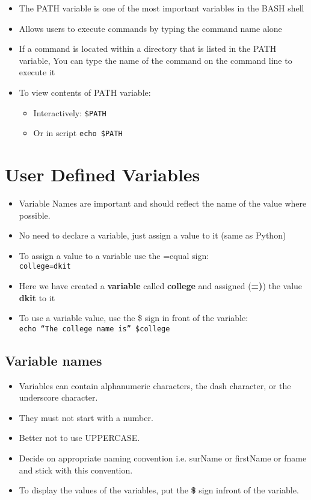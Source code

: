 \documentclass[slides]{pgnotes}
\begin{document}
\begin{itemize}

\item
  The PATH variable is one of the most important variables in the BASH shell
\item
  Allows users to execute commands by typing the command name alone
\item
  If a command is located within a directory that is listed in the PATH variable,
  You can type the name of the command on the command line to execute it
\item
  To view contents of PATH variable:
  \begin{itemize}
  \item
    Interactively: \texttt{\$PATH }
  \item
    Or in script \texttt{echo \$PATH}
  \end{itemize}
\end{itemize}

\section{User Defined Variables}\label{user-defined-variables}

\begin{itemize}
\item
  Variable Names are important and should reflect the name of the value where possible.
\item
  No need to declare a variable, just assign a value to it (same as Python)
\item
  To assign a value to a variable use the =equal sign:\\
  \texttt{college=dkit}
\item
  Here we have created a \textbf{variable} called \textbf{college} and assigned (\textbf{=)}) the value \textbf{dkit} to it
\item
  To use a variable value, use the \$ sign in front of the variable:\\
  \texttt{echo ``The college name is'' \$college}
\end{itemize}

\subsection{Variable names}
\begin{itemize}
\item
  Variables can contain alphanumeric characters, the dash character, or the underscore character.
\item
  They must not start with a number.
\item
  Better not to use UPPERCASE.
\item
  Decide on appropriate naming convention i.e. surName or firstName or fname and stick with this convention.
\item To display the values of the  variables, put the \textbf{\$} sign infront of the variable.
\end{itemize}
\end{document}
